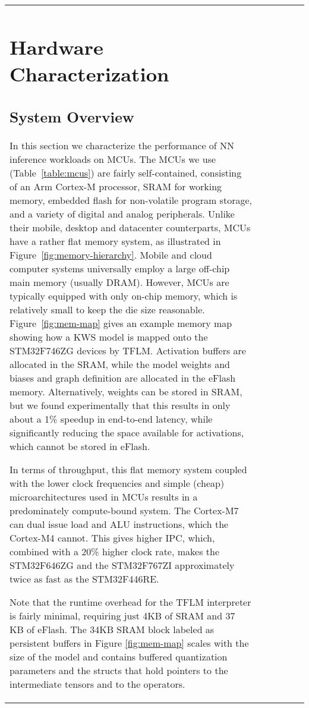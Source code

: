 \documentclass{article}
\begin{document}
\begin{table}[t]
\begin{tabular}{l| c | c | c | c | c}
\section{Hardware Characterization}
\label{sec:hardware}

\subsection{System Overview}
\label{sec:hardware:system}






In this section we characterize the performance of NN inference workloads on MCUs.
The MCUs we use (Table~\ref{table:mcus}) are fairly self-contained, consisting of an Arm Cortex-M processor, SRAM for working memory, embedded flash for non-volatile program storage, and a variety of digital and analog peripherals.
Unlike their mobile, desktop and datacenter counterparts, MCUs have a rather flat memory system, as illustrated in Figure~\ref{fig:memory-hierarchy}.
Mobile and cloud computer systems universally employ a large off-chip main memory (usually DRAM).
However, MCUs are typically equipped with only on-chip memory, which is relatively small to keep the die size reasonable.
Figure~\ref{fig:mem-map} gives an example memory map showing how a KWS model is mapped onto the STM32F746ZG devices by TFLM.
Activation buffers are allocated in the SRAM, while the model weights and biases and graph definition are allocated in the eFlash memory.
Alternatively, weights can be stored in SRAM, but we found experimentally that this results in only about a 1\% speedup in end-to-end latency, while significantly reducing the space available for activations, which cannot be stored in eFlash.



In terms of throughput, this flat memory system coupled with the lower clock frequencies and simple (cheap) microarchitectures used in MCUs results in a predominately compute-bound system.
The Cortex-M7 can dual issue load and ALU instructions, which the Cortex-M4 cannot.
This gives higher IPC, which, combined with a 20\% higher clock rate, makes the STM32F646ZG and the STM32F767ZI approximately twice as fast as the STM32F446RE.


Note that the runtime overhead for the TFLM interpreter is fairly minimal, requiring just 4KB of SRAM and 37 KB of eFlash. The 34KB SRAM block labeled as persistent buffers in Figure \ref{fig:mem-map} scales with the size of the model and contains buffered quantization parameters and the structs that hold pointers to the intermediate tensors and to the operators. 






\end{tabular}
\end{table}
\end{document}
